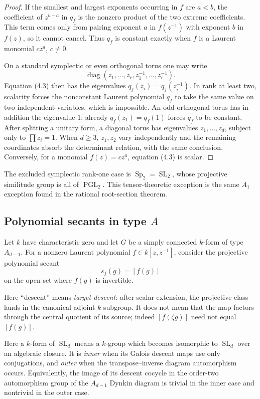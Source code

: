 \documentclass[11pt,reqno]{amsart}
\theoremstyle{definition}
\theoremstyle{remark}
\newcommand{\SL}{\operatorname{SL}}
\newcommand{\PGL}{\operatorname{PGL}}
\newcommand{\Sp}{\operatorname{Sp}}
\newcommand{\diag}{\operatorname{diag}}
\begin{document}
\begin{proof}
If the smallest and largest exponents occurring in \(f\) are \(a<b\), the
coefficient of \(z^{b-a}\) in \(q_f\) is the nonzero product of the two
extreme coefficients.  This term comes only from pairing exponent \(a\) in
\(f(z^{-1})\) with exponent \(b\) in \(f(z)\), so it cannot cancel.  Thus
\(q_f\) is constant exactly when \(f\) is a Laurent monomial
\(cz^a\), \(c\ne0\).

On a standard symplectic or even orthogonal torus one may write
\[
 \diag(z_1,\ldots,z_r,z_1^{-1},\ldots,z_r^{-1}).
\]
Equation (4.3) then has the eigenvalues
\(q_f(z_i)=q_f(z_i^{-1})\).  In rank at least two, scalarity forces the
nonconstant Laurent polynomial \(q_f\) to take the same value on two
independent variables, which is impossible.  An odd orthogonal torus has in
addition the eigenvalue \(1\); already \(q_f(z_1)=q_f(1)\) forces
\(q_f\) to be constant.  After splitting a unitary form, a diagonal torus
has eigenvalues \(z_1,\ldots,z_d\), subject only to
\(\prod z_i=1\).  When \(d\ge3\), \(z_1,z_2\) vary independently and the
remaining coordinates absorb the determinant relation, with the same
conclusion.  Conversely, for a
monomial \(f(z)=cz^a\), equation (4.3) is scalar.
\end{proof}

The excluded symplectic rank-one case is
\(\Sp_2=\SL_2\), whose projective similitude group is all of \(\PGL_2\).
This tensor-theoretic exception is the same \(A_1\) exception found in the
rational root-section theorem.

\subsection{Polynomial secants in type \texorpdfstring{\(A\)}{A}}

Let \(k\) have characteristic zero and let \(G\) be a simply connected
\(k\)-form of type \(A_{d-1}\).  For a
nonzero Laurent polynomial \(f\in k[z,z^{-1}]\), consider the projective polynomial
secant
\[
 s_f(g)=[f(g)]
\tag{4.4}
\]
on the open set where \(f(g)\) is invertible.

Here ``descent'' means \emph{target descent}: after scalar extension, the
projective class lands in the canonical adjoint \(k\)-subgroup.  It does not
mean that the map factors through the central quotient of its source; indeed
\([f(\zeta g)]\) need not equal \([f(g)]\).

Here a \(k\)-form of \(\SL_d\) means a \(k\)-group which becomes isomorphic
to \(\SL_d\) over an algebraic closure.  It is \emph{inner} when its Galois
descent maps use only conjugations, and \emph{outer} when the
transpose--inverse diagram automorphism occurs.  Equivalently, the image of
its descent cocycle in the order-two automorphism group of the
\(A_{d-1}\) Dynkin diagram is trivial in the inner case and nontrivial in the
outer case.
\end{document}
